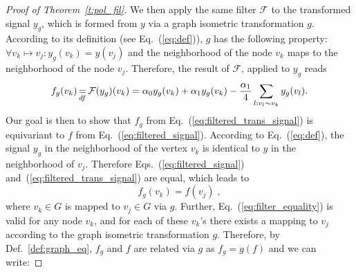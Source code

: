 \documentclass[10pt,journal,compsoc]{IEEEtran}
\newcommand{\df}{\mathop{=}\limits_{df}}
\begin{document}
\begin{proof}[Proof of Theorem~\ref{t:pol_fil}]
		We then apply the same filter $\mathcal{F}$ to the transformed signal $y_g$, which is formed from $y$ via a graph isometric transformation $g$. According to its definition (see Eq.~(\ref{eq:def})), $g$ has the following property: $\forall v_k \mapsto v_j : y_g(v_k) = y(v_j)$ and the neighborhood of the node $v_k$ maps to the neighborhood of the node $v_j$. %
		Therefore, the result of $\mathcal{F}$, applied to $y_g$ reads
		\begin{equation}
		\small
		f_g(v_k) \df \mathcal{F}(y_g)(v_k) = \alpha_0 y_g(v_k) + \alpha_1 y_g(v_k) - \frac{\alpha_1}{4} \sum\limits_{l: v_l \sim v_k} y_g(v_l).
		\label{eq:filtered_trans_signal}
		\end{equation}
		Our goal is then to show that $f_g$ from Eq.~(\ref{eq:filtered_trans_signal}) is equivariant to $f$ from Eq.~(\ref{eq:filtered_signal}).
		According to Eq.~(\ref{eq:def}), the signal $y_g$ in the neighborhood of the vertex $v_k$ is identical to $y$ in the neighborhood of $v_j$. Therefore Eqs.~(\ref{eq:filtered_signal}) and~(\ref{eq:filtered_trans_signal}) are equal, which leads to
		\begin{equation}
		f_g(v_k) = f(v_j)\;,
		\label{eq:filter_equality}
		\end{equation}
		\noindent
		where $v_k \in G$ is mapped to $v_j \in G$ via $g$.
		Further, Eq.~(\ref{eq:filter_equality}) is valid for any node $v_k$, and for each of these $v_k$'s there exists a mapping to $v_j$ according to the graph isometric transformation $g$. Therefore, by Def.~\ref{def:graph_eq}, $f_g$ and $f$ are related via $g$ as $f_g = g(f)$ and we can write:


\end{proof}
\end{document}
